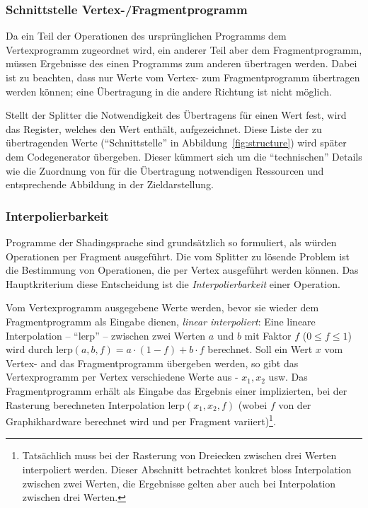 \documentclass[twoside,a4paper,fleqn,12pt]{article}
\begin{document}

\subsubsection{Schnittstelle Vertex-/Fragmentprogramm}
\label{schnittstelle}

Da ein Teil der Operationen des ursprünglichen Programms dem Vertexprogramm zugeordnet wird, ein anderer Teil aber dem
Fragmentprogramm, müssen Ergebnisse des einen Programms zum anderen übertragen werden.
Dabei ist zu beachten, dass nur Werte vom Vertex- zum Fragmentprogramm übertragen werden können; %
eine Übertragung in die andere Richtung ist nicht möglich.

Stellt der Splitter die Notwendigkeit des Übertragens für einen Wert fest, wird das Register, welches den Wert enthält, aufgezeichnet.
Diese Liste der zu übertragenden Werte ("`Schnittstelle"' in Abbildung~\ref{fig:structure}) wird später dem Codegenerator übergeben.
Dieser kümmert sich um die "`technischen"' Details wie die Zuordnung von für die Übertragung notwendigen Ressourcen und %
entsprechende Abbildung in der Zieldarstellung.

\subsubsection{Interpolierbarkeit}
\label{Interpolierbarkeit}

Programme der Shadingsprache sind grundsätzlich so formuliert, als würden Operationen per Fragment ausgeführt. %
Die vom Splitter zu lösende Problem ist die Bestimmung von Operationen, die per Vertex ausgeführt werden können.
Das Hauptkriterium diese Entscheidung ist die \emph{Interpolierbarkeit} einer Operation.

\newcommand\lerp{\mathrm{lerp}}
Vom Vertexprogramm ausgegebene Werte werden, bevor sie wieder dem Fragmentprogramm als Eingabe dienen, \emph{linear interpoliert}: %
Eine lineare Interpolation -- "`$\lerp$"' -- zwischen zwei Werten $a$ und $b$ mit Faktor $f$ ($0 \le f \le 1$) wird durch $\lerp(a, b, f) = a \cdot (1-f) + b \cdot f$ berechnet.
Soll ein Wert $x$ vom Vertex- and das Fragmentprogramm übergeben werden, so gibt das Vertexprogramm per Vertex verschiedene Werte aus - $x_1, x_2$ usw.
Das Fragmentprogramm erhält als Eingabe das Ergebnis einer implizierten, bei der Rasterung berechneten Interpolation $\lerp(x_1, x_2, f)$ (wobei $f$ von der Graphikhardware berechnet wird
und per Fragment variiert)\footnote{Tatsächlich muss bei der Rasterung von Dreiecken zwischen drei Werten interpoliert werden. Dieser Abschnitt betrachtet konkret
bloss Interpolation zwischen zwei Werten, die Ergebnisse gelten aber auch bei Interpolation zwischen drei Werten.}.
\end{document}
